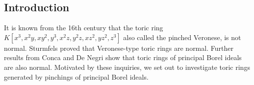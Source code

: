 \documentclass[a0, landscape]{a0poster}
\begin{document}
\begin{multicols}{4} %






\section*{\color{DarkSlateBlue}Introduction}




It is known from the 16th century that the toric ring
$K[x^3, x^2y, xy^2, y^3, x^2z, y^2z, xz^2, yz^2, z^3]$ also called the pinched Veronese, is not normal. Sturmfels \citep{Sturmfels1996} proved that Veronese-type toric rings are normal. Further results from Conca and De Negri \citep{Negri1999} \citep{Bruns2017} show that toric rings of principal Borel ideals are also normal. Motivated by these inquiries, we set out to investigate toric rings generated by pinchings of principal Borel ideals. 



\end{multicols}
\end{document}
